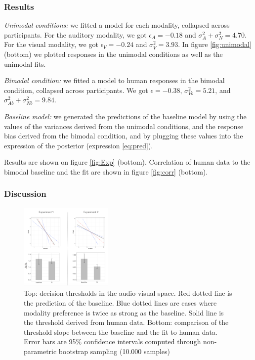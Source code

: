 \documentclass[10pt,letterpaper]{article}
\begin{document}
\subsubsection{Results}

\textit{Unimodal conditions:} we fitted a model for each modality, collapsed across participants. For the auditory modality, we got $\epsilon_A=-0.18$ and $\sigma^2_A+\sigma^2_N=4.70$. For the visual modality, we got $\epsilon_V=-0.24$ and $\sigma^2_V=3.93$.  In figure \ref{fig:unimodal} (bottom) we plotted responses in the unimodal conditions as well as the unimodal fits.

\textit{Bimodal condition:} we fitted a model to human responses in the bimodal condition, collapsed across participants. We got $\epsilon=-0.38$, $\sigma^2_{Vb}=5.21$, and  $\sigma^2_{Ab}+\sigma^2_{Nb}=9.84$. 

\textit{Baseline model:} we generated the predictions of the baseline model by using the values of the variances derived from the unimodal conditions, and the response bias derived from the bimodal condition, and by plugging these values into the expression of the posterior (expression \ref{eq:pred}).

Results are shown on  figure \ref{fig:Exp} (bottom).  Correlation of human data to the bimodal baseline and the fit are shown in figure \ref{fig:corr} (bottom). 

\subsubsection{Discussion}

\begin{figure}[h]
\centering
\includegraphics[width=0.4\textwidth]{preference.png}
\caption{Top: decision thresholds in the audio-visual space. Red dotted line is the prediction of the baseline. Blue dotted lines are cases where modality preference is twice as strong as the baseline. Solid line is the threshold derived from human data. Bottom: comparison of the threshold slope between the baseline and the fit to human data. Error bars are 95\% confidence intervals computed through non-parametric bootstrap sampling (10.000 samples)}
\label{fig:pref}
\end{figure}
\end{document}

